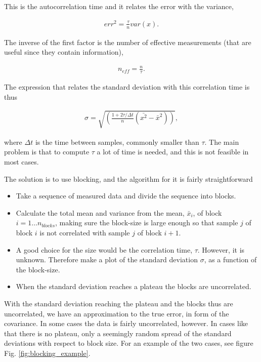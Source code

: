 		This is the autocorrelation time and it relates the error with the variance,

		\begin{align}
			err^2=\frac{\tau}{n}var\left(x\right).
		\end{align}

		The inverse of the first factor is  the number of effective measurements (that are useful since they contain information),

		\begin{align}
			n_{eff}=\frac{n}{\tau}.
		\end{align}

		The expression that relates the standard deviation with this correlation time is thus

		\begin{align}
			\sigma=\sqrt{\left(\frac{1+2\tau/\Delta t}{n}\left(\bar{x^2}-\bar{x}^2\right)\right)},
		\end{align}

		where $\Delta t$ is the time between samples, commonly smaller than $\tau$. The main problem is that to compute $\tau$ a lot of time is needed, and this is not feasible in most cases.

		The solution is to use blocking, and the algorithm for it is fairly straightforward 
		\begin{itemize}
			\item Take a sequence of measured data and divide the sequence into blocks.
			\item Calculate the total mean and variance from the mean, $\bar{x}_i$, of block $i=1\dots n_{blocks}$, making sure the block-size is large enough so that sample $j$ of block $i$ is not correlated with sample $j$ of block $i+1$.
			\item A good choice for the size would be the correlation time, $\tau$. However, it is unknown. Therefore make a plot of the standard deviation $\sigma$, as a function of the block-size.
			\item When the standard deviation reaches a plateau the blocks are uncorrelated.
		\end{itemize} 
		
		With the standard deviation reaching the plateau and the blocks thus are uncorrelated, we have an approximation to the true error, in form of the covariance. In some cases the data is fairly uncorrelated, however. In cases like that there is no plateau, only a seemingly random  spread of the standard deviations with respect to block size. For an example of the two cases, see figure Fig. \ref{fig:blocking_example}.


